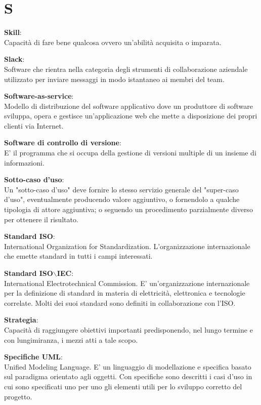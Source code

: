 \documentclass[a4paper, oneside, openany, dvipsnames, table]{article}
\begin{document}
\newpage
\section{S}
\textbf{Skill}:\\	Capacità di fare bene qualcosa ovvero un'abilità acquisita o imparata.

\textbf{Slack}:\\	Software che rientra nella categoria degli strumenti di collaborazione aziendale utilizzato per inviare messaggi in modo istantaneo ai membri del team.

\textbf{Software-as-service}:\\	Modello di distribuzione del software applicativo dove un produttore di software sviluppa, opera e gestisce un'applicazione web che mette a disposizione dei propri clienti via Internet.

\textbf{Software di controllo di versione}:\\ E' il programma che si occupa della  gestione di versioni multiple di un insieme di informazioni.

\textbf{Sotto-caso d'uso}:\\
Un "sotto-caso d'uso" deve fornire lo stesso servizio generale del "super-caso d'uso", eventualmente producendo valore aggiuntivo, o fornendolo a qualche tipologia di attore aggiuntiva; o seguendo un procedimento parzialmente diverso per ottenere il risultato.

\textbf{Standard ISO}:\\	International Organization for Standardization. L'organizzazione internazionale che emette standard in tutti i campi interessati.

\textbf{Standard ISO$\backslash$IEC}:\\	International Electrotechnical Commission. E' un'organizzazione internazionale per la definizione di standard in materia di elettricità, elettronica e tecnologie correlate. Molti dei suoi standard sono definiti in collaborazione con l'ISO.

\textbf{Strategia}:\\	Capacità di raggiungere obiettivi importanti predisponendo, nel lungo termine e con lungimiranza, i mezzi atti a tale scopo.

\textbf{Specifiche UML}:\\	Unified Modeling Language. E' un linguaggio di modellazione e specifica basato sul paradigma orientato agli oggetti. Con specifiche  sono descritti i casi d'uso in cui sono specificati uno per uno gli elementi utili per lo sviluppo corretto del progetto.
\end{document}
